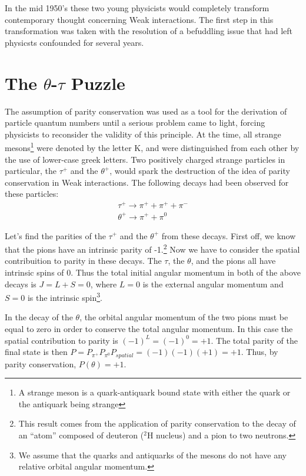 \documentclass[12pt]{book}
\begin{document}
In the mid 1950's these two young physicists would completely transform contemporary thought concerning Weak interactions. The first step in this transformation was taken with the resolution of a befuddling issue that had left physicsts confounded for several years. 

\section{The $\theta$-$\tau$ Puzzle}

The assumption of parity conservation was used as a tool for the derivation of particle quantum numbers  until a serious problem came to light, forcing physicists to reconsider the validity of this principle. At the time, all strange mesons\footnote{A strange meson is a quark-antiquark bound state with either the quark or the antiquark being strange} were denoted by the letter K, and were distinguished from each other by the use of lower-case greek letters\cite{brandt}. Two positively charged strange particles in particular, the $\tau^{+}$ and the $\theta^{+}$, would spark the destruction of the idea of parity conservation in Weak interactions. The following decays had been observed for these particles:
\begin{gather}
 \tau^{+} \longrightarrow \pi^{+}+\pi^{+}+\pi^{-} \\
 \theta^{+} \longrightarrow \pi^{+}+\pi^{0}
\end{gather}

Let's find the parities of the $\tau^{+}$ and the $\theta^{+}$ from these decays. First off, we know that the pions have an intrinsic parity of -1.\footnote{This result comes from the application of parity conservation to the decay of an ``atom'' composed of deuteron ($^{2}$H nucleus) and a pion to two neutrons.} Now we have to consider the spatial contribuition to parity in these decays. The $\tau$, the $\theta$, and the pions all have intrinsic spins of 0. Thus the total initial angular momentum in both of the above decays is $J=L+S=0$, where $L=0$ is the external angular momentum and $S=0$ is the intrinsic spin\footnote{We assume that the quarks and antiquarks of the mesons do not have any relative orbital angular momentum\cite{povh}.}.

In the decay of the $\theta$, the orbital angular momentum of the two pions must be equal to zero in order to conserve the total angular momentum. In this case the spatial contribution to parity is $(-1)^{L}=(-1)^{0}=+1$. The total parity of the final state is then $P=P_{\pi^{+}}P_{\pi^{0}}P_{spatial}=(-1)(-1)(+1)=+1$. Thus, by parity conservation, $P(\theta)=+1$.
\end{document}
